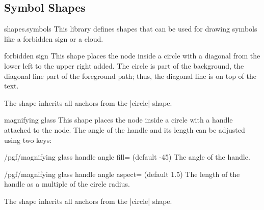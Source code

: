 \subsection{Symbol Shapes}

\begin{pgflibrary}{shapes.symbols}
  This library defines shapes that can be used for drawing symbols
  like a forbidden sign or a cloud.
\end{pgflibrary}



\begin{shape}{forbidden sign}
  This shape places the node inside a circle with a diagonal from the
  lower left to the upper right added. The circle is part of the
  background, the diagonal line part of the foreground path; thus, the
  diagonal line is on top of the text.

\begin{codeexample}[]
\end{codeexample}

  The shape inherits all anchors from the |circle| shape.
\end{shape}


\begin{shape}{magnifying glass}
  This shape places the node inside a circle with a handle attached to
  the node. The angle of the handle and its length can be adjusted
  using two keys:

  \begin{key}{/pgf/magnifying glass handle angle fill= (default -45)}
    The angle of the handle.
  \end{key}

  \begin{key}{/pgf/magnifying glass handle angle aspect= (default 1.5)}
    The length of the handle as a multiple of the circle radius.
  \end{key}

\begin{codeexample}[]
\end{codeexample}
  The shape inherits all anchors from the |circle| shape.
\end{shape}


